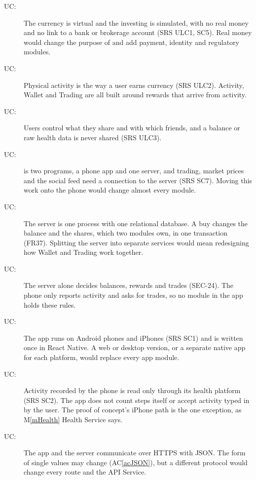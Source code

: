\documentclass[12pt, titlepage]{article}
\newcommand{\acref}[1]{AC\ref{#1}}
\newcounter{ucnum}
\newcommand{\uctheucnum}{UC\theucnum}
\newcommand{\mref}[1]{M\ref{#1}}
\begin{document}
\begin{description}
\item[ \uctheucnum \label{ucNoRealMoney}:] The currency
  is virtual and the investing is simulated, with no real money and no link to
  a bank or brokerage account (SRS ULC1, SC5). Real money would change the
  purpose of \progname{} and add payment, identity and regulatory modules.
\item[ \uctheucnum \label{ucActivityEarns}:] Physical
  activity is the way a user earns currency (SRS ULC2). Activity, Wallet and
  Trading are all built around rewards that arrive from activity.
\item[ \uctheucnum \label{ucSharingControl}:] Users
  control what they share and with which friends, and a balance or raw health
  data is never shared (SRS ULC3).
\item[ \uctheucnum \label{ucClientServer}:] \progname{}
  is two programs, a phone app and one server, and trading, market prices and
  the social feed need a connection to the server (SRS SC7). Moving this work
  onto the phone would change almost every module.
\item[ \uctheucnum \label{ucOneDatabase}:] The server is
  one process with one relational database. A buy changes the balance and the
  shares, which two modules own, in one transaction (FR37). Splitting the
  server into separate services would mean redesigning how Wallet and Trading
  work together.
\item[ \uctheucnum \label{ucServerDecides}:] The server
  alone decides balances, rewards and trades (SEC-24). The phone only reports
  activity and asks for trades, so no module in the app holds these rules.
\item[ \uctheucnum \label{ucPlatform}:] The app runs on
  Android phones and iPhones (SRS SC1) and is written once in React Native.
  A web or desktop version, or a separate native app for each platform, would
  replace every app module.
\item[ \uctheucnum \label{ucHealthPlatform}:] Activity
  recorded by the phone is read only through its health platform (SRS SC2).
  The app does not count steps itself or accept activity typed in by the user.
  The proof of concept's iPhone path is the one exception, as
  \mref{mHealth} Health Service says.
\item[ \uctheucnum \label{ucProtocol}:] The app and the
  server communicate over HTTPS with JSON. The form of single values may change
  (\acref{acJSON}), but a different protocol would change every route and the
  API Service.
\end{description}
\end{document}
